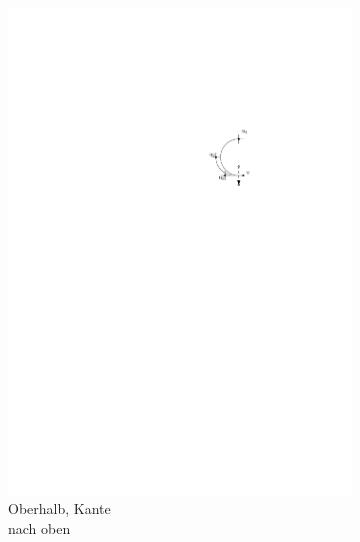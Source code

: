 \documentclass[a4paper]{scrreprt}
\theoremstyle{definition}
\begin{document}
\begin{figure}[h]
\begin{subfigure}[b]{0.2\textwidth}
                \includegraphics[width=\textwidth]{schnitt_finden_top_upwards}
                \caption{Oberhalb, Kante \\ nach oben}
                \label{fig:cutfinding_top_upwards}
        \end{subfigure}
        \quad
        \begin{subfigure}[b]{0.2\textwidth}

\end{subfigure}
\end{figure}
\end{document}
